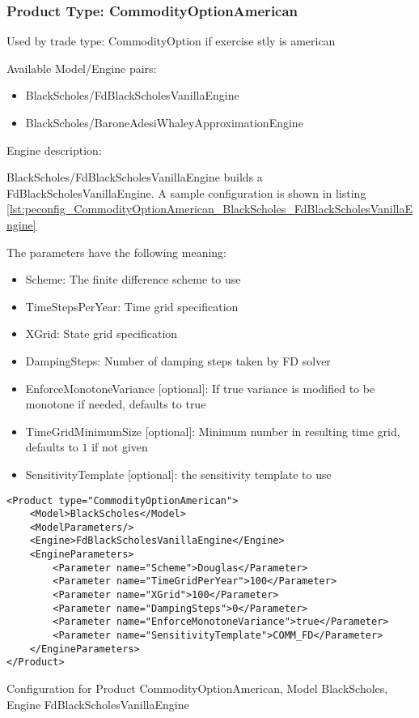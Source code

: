 \subsubsection{Product Type: CommodityOptionAmerican}

Used by trade type: CommodityOption if exercise stly is american

Available Model/Engine pairs:

\begin{itemize}
\item BlackScholes/FdBlackScholesVanillaEngine
\item BlackScholes/BaroneAdesiWhaleyApproximationEngine
\end{itemize}

Engine description:

BlackScholes/FdBlackScholesVanillaEngine builds a FdBlackScholesVanillaEngine. A sample configuration is shown in listing
\ref{lst:peconfig_CommodityOptionAmerican_BlackScholes_FdBlackScholesVanillaEngine}

The parameters have the following meaning:

\begin{itemize}
\item Scheme: The finite difference scheme to use
\item TimeStepsPerYear: Time grid specification
\item XGrid: State grid specification
\item DampingSteps: Number of damping steps taken by FD solver
\item EnforceMonotoneVariance [optional]: If true variance is modified to be monotone if needed, defaults to true
\item TimeGridMinimumSize [optional]: Minimum number in resulting time grid, defaults to $1$ if not given
\item SensitivityTemplate [optional]: the sensitivity template to use 
\end{itemize}

\begin{longlisting}
\begin{verbatim}
<Product type="CommodityOptionAmerican">
    <Model>BlackScholes</Model>
    <ModelParameters/>
    <Engine>FdBlackScholesVanillaEngine</Engine>
    <EngineParameters>
        <Parameter name="Scheme">Douglas</Parameter>
        <Parameter name="TimeGridPerYear">100</Parameter>
        <Parameter name="XGrid">100</Parameter>
        <Parameter name="DampingSteps">0</Parameter>
        <Parameter name="EnforceMonotoneVariance">true</Parameter>
        <Parameter name="SensitivityTemplate">COMM_FD</Parameter>
    </EngineParameters>
</Product>
\end{verbatim}
\caption{Configuration for Product CommodityOptionAmerican, Model BlackScholes, Engine FdBlackScholesVanillaEngine}
\label{lst:peconfig_CommodityOptionAmerican_BlackScholes_FdBlackScholesVanillaEngine}
\end{longlisting}

